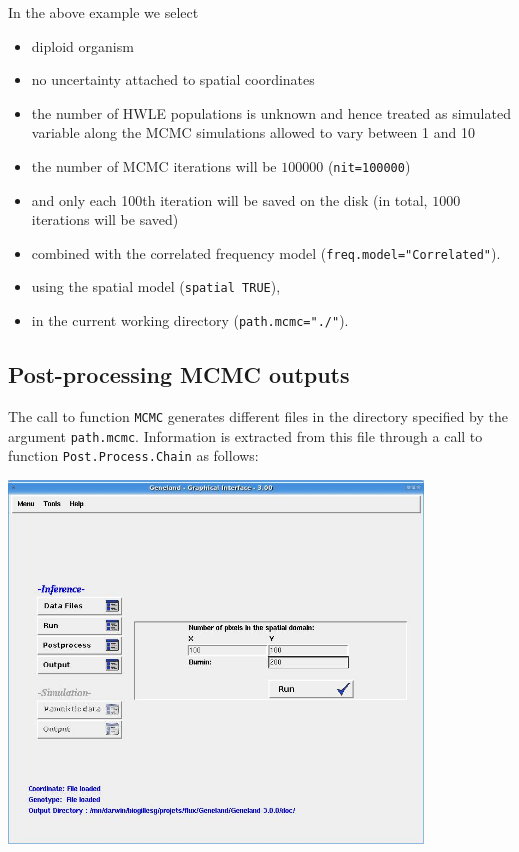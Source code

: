 \documentclass[a4paper,10pt]{article}
\begin{document}
\bigskip

In the above example we select

\begin{itemize}
\item diploid organism
\item no uncertainty attached to spatial coordinates
\item the number of HWLE populations is unknown and hence treated as simulated 
variable along the MCMC simulations allowed to vary between 1 and 10
\item the number of MCMC iterations will be $100000$ (\texttt{nit=100000}) 
\item and only each 100th iteration will be saved on the disk (in total, $1000$ iterations will be saved)
\item combined with 
the correlated frequency model (\texttt{freq.model="Correlated"}). 

\item using the spatial model (\texttt{spatial TRUE}), 


\item in the current working directory (\texttt{path.mcmc="./"}).
\end{itemize}


 

\clearpage
\subsection{Post-processing MCMC outputs}



The call to function \texttt{MCMC} generates different files in the directory specified by the argument \texttt{path.mcmc}. 
Information is extracted from this file through a call to function \texttt{Post.Process.Chain} as follows:\\


\centerline{\includegraphics[width=11cm]{./fig/postproc.jpg}}
\end{document}
